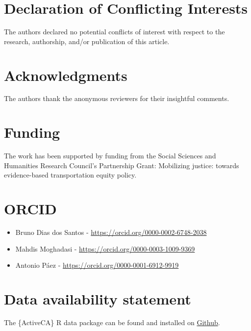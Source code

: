 \documentclass[Royal,times,sageh]{sagej}
\providecommand{\tightlist}{%
  \setlength{\itemsep}{0pt}\setlength{\parskip}{0pt}}
\begin{document}
\section{Declaration of Conflicting
Interests}\label{declaration-of-conflicting-interests}

The authors declared no potential conflicts of interest with respect to
the research, authorship, and/or publication of this article.

\section{Acknowledgments}\label{acknowledgments}

The authors thank the anonymous reviewers for their insightful comments.

\section{Funding}\label{funding}

The work has been supported by funding from the Social Sciences and
Humanities Research Council's Partnership Grant: Mobilizing justice:
towards evidence-based transportation equity policy.

\section{ORCID}\label{orcid}

\begin{itemize}
\tightlist
\item
  Bruno Dias dos Santos - \url{https://orcid.org/0000-0002-6748-2038}
\item
  Mahdis Moghadasi - \url{https://orcid.org/0000-0003-1009-9369}
\item
  Antonio Páez - \url{https://orcid.org/0000-0001-6912-9919}
\end{itemize}

\section{Data availability statement}\label{data-availability-statement}

The \{ActiveCA\} R data package can be found and installed on
\href{https://github.com/dias-bruno/ActiveCA}{Github}.



\end{document}
